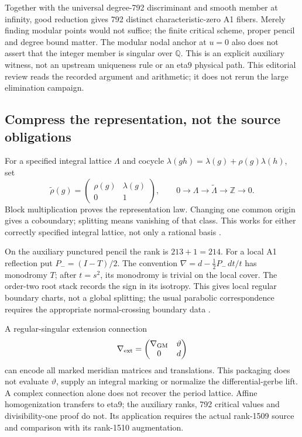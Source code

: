 \documentclass[11pt,a4paper]{article}
\begin{document}
Together with the universal degree-792 discriminant and smooth
member at infinity, good reduction gives 792 distinct
characteristic-zero A1 fibers. Merely finding modular points
would not suffice; the finite critical scheme, proper pencil and
degree bound matter. The modular nodal anchor at \(u=0\) also
does not assert that the integer member is singular over \(\mathbb Q\).
This is an explicit auxiliary witness, not an upstream uniqueness
rule or an eta9 physical path. This editorial review reads the
recorded argument and arithmetic; it does not rerun the large
elimination campaign.

\subsection{Compress the representation, not the source obligations}
\label{sec:deligne-affine-connection}
For a specified integral lattice \(\Lambda\) and cocycle
\(\lambda(gh)=\lambda(g)+\rho(g)\lambda(h)\), set
\[
 \widetilde\rho(g)=
 \begin{pmatrix}\rho(g)&\lambda(g)\\0&1\end{pmatrix},
 \qquad
 0\to\Lambda\to\widetilde\Lambda\to\mathbb Z\to0 .
 \tag{D9}\label{eq:deligne-affine}
\]
Block multiplication proves the representation law.
Changing one common origin gives a coboundary; splitting means
vanishing of that class. This works for either correctly specified
integral lattice, not only a rational basis
\cite{PreprojectionAffineGM2026}.

On the auxiliary punctured pencil the rank is \(213+1=214\).
For a local A1 reflection put \(P_-=(I-T)/2\). The convention
\(\nabla=d-\tfrac12P_-\,dt/t\) has monodromy \(T\);
after \(t=s^2\), its monodromy is trivial on the local cover.
The order-two root stack records the sign in its isotropy.
This gives local regular boundary charts, not a global splitting;
the usual parabolic correspondence requires the appropriate
normal-crossing boundary data \cite{BorneLaaroussi2021}.

A regular-singular extension connection
\[
 \nabla_{\rm ext}=
 \begin{pmatrix}\nabla_{\rm GM}&\vartheta\\0&d\end{pmatrix}
\]
can encode all marked meridian matrices and translations.
This packaging does not evaluate \(\vartheta\), supply an integral
marking or normalize the differential-gerbe lift. A complex
connection alone does not recover the period lattice.
Affine homogenization transfers to eta9; the auxiliary ranks,
792 critical values and divisibility-one proof do not. Its
application requires the actual rank-1509 source and comparison
with its rank-1510 augmentation.
\end{document}
